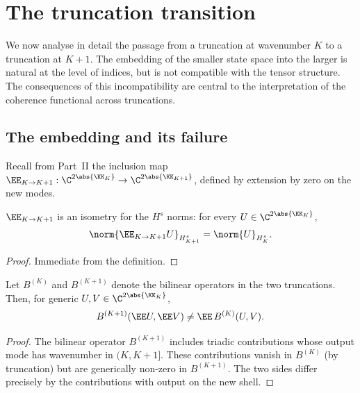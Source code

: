 \section{The truncation transition}
\label{part-4:sec:transition}

We now analyse in detail the passage from a truncation at wavenumber 
$K$ to a truncation at $K+1$. The embedding of the smaller state 
space into the larger is natural at the level of indices, but is not 
compatible with the tensor structure. The consequences of this 
incompatibility are central to the interpretation of the coherence 
functional across truncations.

\subsection{The embedding and its failure}
\label{part-4:ssec:embedding-failure}

Recall from Part~II the inclusion map 
$\EE_{K\to K+1}:\C^{2\abs{\KK_K}}\to\C^{2\abs{\KK_{K+1}}}$, defined 
by extension by zero on the new modes.

\begin{proposition}[Isometry]\label{part-4:prop:iso}
$\EE_{K\to K+1}$ is an isometry for the $H^s$ norms: for every 
$U\in\C^{2\abs{\KK_K}}$,
\begin{equation}\label{part-4:eq:iso}
\norm{\EE_{K\to K+1}U}_{H^s_{K+1}} = \norm{U}_{H^s_K}.
\end{equation}
\end{proposition}

\begin{proof}
Immediate from the definition.
\end{proof}

\begin{proposition}\label{part-4:prop:non-comm-bilinear}
Let $B^{(K)}$ and $B^{(K+1)}$ denote the bilinear operators in the 
two truncations. Then, for generic $U,V\in\C^{2\abs{\KK_K}}$,
\begin{equation}\label{part-4:eq:non-comm-bilinear}
B^{(K+1)}(\EE U,\EE V) \neq \EE\,B^{(K)}(U,V).
\end{equation}
\end{proposition}

\begin{proof}
The bilinear operator $B^{(K+1)}$ includes triadic contributions 
whose output mode has wavenumber in $(K,K+1]$. These contributions 
vanish in $B^{(K)}$ (by truncation) but are generically non-zero in 
$B^{(K+1)}$. The two sides differ precisely by the contributions 
with output on the new shell.
\end{proof}

